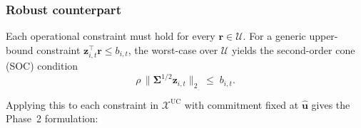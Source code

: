 \documentclass[journal]{IEEEtran}
\begin{document}
\subsubsection{Robust counterpart}
Each operational constraint must hold for every
$\mathbf{r} \in \mathcal{U}$.
For a generic upper-bound constraint
$\mathbf{z}_{i,t}^\top \mathbf{r} \leq b_{i,t}$, the worst-case
over $\mathcal{U}$ yields the second-order cone (SOC) condition
\begin{equation}\label{eq:soc_generic}
    \rho\,
    \bigl\lVert
      \boldsymbol{\Sigma}^{1/2} \mathbf{z}_{i,t}
    \bigr\rVert_2
    \;\leq\; b_{i,t}.
\end{equation}

Applying this to each constraint in $\mathcal{X}^{\text{UC}}$ with
commitment fixed at $\hat{\mathbf{u}}$ gives the Phase~2 formulation:
\end{document}
